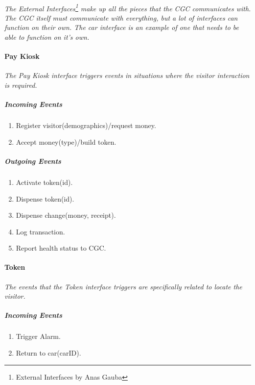 \documentclass[12pt]{article}
\begin{document}
    \paragraph{} \textit{The External Interfaces\footnote{External Interfaces by Anas Gauba} 
    make up all the pieces that the CGC communicates with. The CGC itself must 
    communicate with everything,     but a lot of interfaces can function on their own. The 
    car interface is an example of one that needs to be able to function on it's own.}
        
    \paragraph{Pay Kiosk}
    \paragraph {}\textit{The Pay Kiosk interface triggers events in situations where the visitor interaction is required.  }
        \subparagraph{Incoming Events}
        \begin{enumerate}
            \item Register visitor(demographics)/request money.
            \item Accept money(type)/build token.
        \end{enumerate}
                
        \subparagraph{Outgoing Events}
        \begin{enumerate}
            \item Activate token(id).
            \item Dispense token(id). 
            \item Dispense change(money, receipt).
            \item Log transaction. 
            \item Report health status to CGC. 
        \end{enumerate}

    \paragraph{Token}
    \paragraph {}\textit{The events that the Token interface triggers are specifically related to locate the visitor.  }
        \subparagraph{Incoming Events}
        \begin{enumerate}
            \item Trigger Alarm. 
            \item Return to car(carID). 
        \end{enumerate}
                
\end{document}
